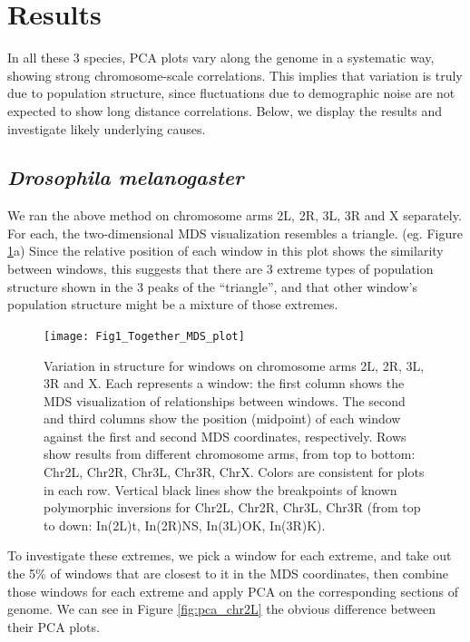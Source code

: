 \documentclass[11pt, oneside]{article}   	%
\begin{document}
\section{Results}
In all these 3 species, PCA plots vary along the genome in a systematic way, showing strong chromosome-scale correlations.
This implies that variation is truly due to population structure, 
since fluctuations due to demographic noise are not expected to show long distance correlations. 
Below, we display the results and investigate likely underlying causes.

\subsection{\textit{Drosophila melanogaster}}
We ran the above method on chromosome arms 2L, 2R, 3L, 3R and X separately. 
For each, the two-dimensional MDS visualization resembles a triangle. (eg. Figure \ref{fig:mds_chr2L}a) 
Since the relative position of each window in this plot shows the similarity between windows, this suggests that there are 3 extreme types of population structure shown in the 3 peaks of the ``triangle'', and that other window's population structure might be a mixture of those extremes. 

\begin{figure}
    \begin{center}
       \texttt{[image: Fig1\_Together\_MDS\_plot]}
    \end{center}
    \caption{
         Variation in structure for windows on chromosome arms 2L, 2R, 3L, 3R and X. 
         Each represents a window: the first column shows the MDS visualization of relationships between windows. 
         The second and third columns show the position (midpoint) of each window against the first and second MDS coordinates, respectively. 
         Rows show results from different chromosome arms, from top to bottom: Chr2L, Chr2R, Chr3L, Chr3R, ChrX. 
         Colors are consistent for plots in each row. 
         Vertical black lines show the breakpoints of known polymorphic inversions for Chr2L, Chr2R, Chr3L, Chr3R (from top to down: In(2L)t, In(2R)NS, In(3L)OK, In(3R)K).
         \label{fig:mds_chr2L}
    }
\end{figure}


To investigate these extremes, we pick a window for each extreme, 
and take out the 5\% of windows that are closest to it in the MDS coordinates, 
then combine those windows for each extreme and apply PCA on the corresponding sections of genome. 
We can see in Figure \ref{fig:pca_chr2L} the obvious difference between their PCA plots. 
\end{document}
